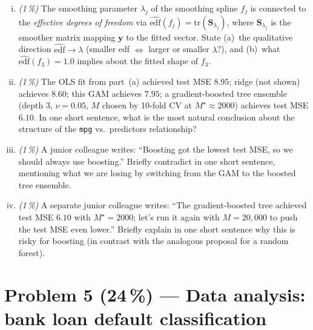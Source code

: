\documentclass[11pt,a4paper]{article}
\newcommand{\points}[1]{\textbf{(#1\,\%)}}
\newcommand{\subpoints}[1]{\textit{(#1\,\%)}}
\begin{document}
\begin{enumerate}[(i)]
  \item \subpoints{1} The smoothing parameter $\lambda_j$ of the smoothing spline $f_j$ is connected to the \emph{effective degrees of freedom} via $\widehat{\mathrm{edf}}(f_j) = \mathrm{tr}(\mathbf{S}_{\lambda_j})$, where $\mathbf{S}_{\lambda_j}$ is the smoother matrix mapping $\mathbf{y}$ to the fitted vector. State (a)~the qualitative direction $\widehat{\mathrm{edf}} \to \lambda$ (smaller edf $\Leftrightarrow$ larger or smaller $\lambda$?), and (b)~what $\widehat{\mathrm{edf}}(f_3) = 1.0$ implies about the fitted shape of $f_3$.

  \item \subpoints{1} The OLS fit from part~(a) achieved test MSE $8.95$; ridge (not shown) achieves $8.60$; this GAM achieves $7.95$; a gradient-boosted tree ensemble (depth $3$, $\nu = 0.05$, $M$ chosen by 10-fold CV at $M^\star \approx 2000$) achieves test MSE $6.10$. In one short sentence, what is the most natural conclusion about the structure of the \texttt{mpg} vs.\ predictors relationship?

  \item \subpoints{1} A junior colleague writes: ``Boosting got the lowest test MSE, so we should always use boosting.'' Briefly contradict in one short sentence, mentioning what we are losing by switching from the GAM to the boosted tree ensemble.

  \item \subpoints{1} A separate junior colleague writes: ``The gradient-boosted tree achieved test MSE $6.10$ with $M^\star = 2000$; let's run it again with $M = 20{,}000$ to push the test MSE even lower.'' Briefly explain in one short sentence why this is risky for boosting (in contrast with the analogous proposal for a random forest).
\end{enumerate}

\vfill\eject

\section*{Problem 5 \points{24} --- Data analysis: bank loan default classification}
\end{document}
